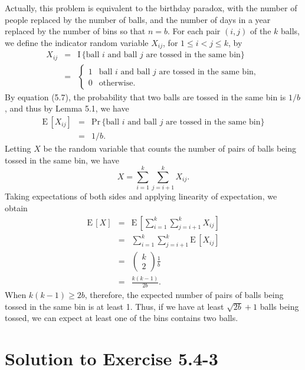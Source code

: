 \documentclass[a4paper, fleqn]{article}
\begin{document}
Actually, this problem is equivalent to the birthday paradox, with the number of
people replaced by the number of balls, and the number of days in a year replaced
by the number of bins so that $n = b$. For each pair $(i,j)$ of the $k$ balls, we
define the indicator random variable $X_{ij}$, for $1 \leq i < j \leq k$, by
\begin{eqnarray*}
X_{ij} & = & \mbox{I}\,\{\mbox{ball } i \mbox{ and ball } j \mbox{ are tossed in the same bin}\} \\
       & = & \left\{ \begin{array}{ll}
       1 & \mbox{ball } i \mbox{ and ball } j \mbox{ are tossed in the same bin}, \\
       0 & \mbox{otherwise}.
       \end{array}\right.
\end{eqnarray*}
By equation (5.7), the probability that two balls are tossed in the same bin is
$1/b$, and thus by Lemma 5.1, we have
\begin{eqnarray*}
\mbox{E}\,[X_{ij}] & = & \mbox{Pr}\,\{\mbox{ball } i \mbox{ and ball } j \mbox{ are tossed in the same bin}\} \\
                   & = & 1/b.
\end{eqnarray*}
Letting $X$ be the random variable that counts the number of pairs of balls being
tossed in the same bin, we have
\[
X = \sum_{i = 1}^k \sum_{j = i + 1}^k X_{ij}.
\]
Taking expectations of both sides and applying linearity of expectation, we obtain
\begin{eqnarray*}
\mbox{E}\,[X] & = & \mbox{E}\,\left[\sum_{i = 1}^k \sum_{j = i + 1}^k X_{ij}\right] \\
              & = & \sum_{i = 1}^k \sum_{j = i + 1}^k \mbox{E}\,[X_{ij}] \\
              & = & \left(\!\begin{array}{c} k \\ 2 \end{array}\!\right)  \frac{1}{b}\\
              & = & \frac{k(k - 1)}{2b}.
\end{eqnarray*}
When $k(k - 1) \geq 2b$, therefore, the expected number of pairs of balls being
tossed in the same bin is at least 1. Thus, if we have at least $\sqrt{2b} + 1$
balls being tossed, we can expect at least one of the bins contains two balls.







\section*{Solution to Exercise 5.4-3}
\end{document}
